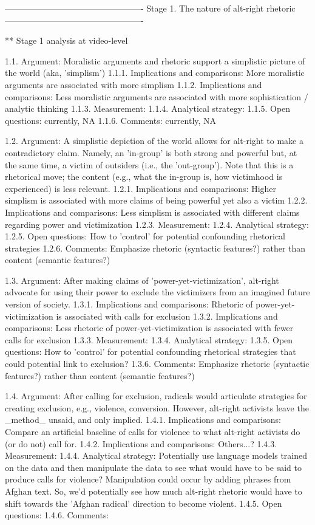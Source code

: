 
-------------------------------------------------
Stage 1. The nature of alt-right rhetoric
-------------------------------------------------

** Stage 1 analysis at video-level

1.1. Argument: Moralistic arguments and rhetoric support a simplistic picture of the world (aka, 'simplism')
1.1.1. Implications and comparisons: More moralistic arguments are associated with more simplism
1.1.2. Implications and comparisons: Less moralistic arguments are associated with more sophistication / analytic thinking
1.1.3. Measurement:
1.1.4. Analytical strategy:
1.1.5. Open questions: currently, NA
1.1.6. Comments: currently, NA

1.2. Argument: A simplistic depiction of the world allows for alt-right to make a contradictory claim. Namely, an 'in-group' is both strong and powerful but, at the same time, a victim of outsiders (i.e., the 'out-group'). Note that this is a rhetorical move; the content (e.g., what the in-group is, how victimhood is experienced) is less relevant.
1.2.1. Implications and comparisons: Higher simplism is associated with more claims of being powerful yet also a victim
1.2.2. Implications and comparisons: Less simplism is associated with different claims regarding power and victimization
1.2.3. Measurement:
1.2.4. Analytical strategy:
1.2.5. Open questions: How to 'control' for potential confounding rhetorical strategies
1.2.6. Comments: Emphasize rhetoric (syntactic features?) rather than content (semantic features?)

1.3. Argument: After making claims of 'power-yet-victimization', alt-right advocate for using their power to exclude the victimizers from an imagined future version of society.
1.3.1. Implications and comparisons: Rhetoric of power-yet-victimization is associated with calls for exclusion
1.3.2. Implications and comparisons: Less rhetoric of power-yet-victimization is associated with fewer calls for exclusion
1.3.3. Measurement:
1.3.4. Analytical strategy:
1.3.5. Open questions: How to 'control' for potential confounding rhetorical strategies that could potential link to exclusion?
1.3.6. Comments: Emphasize rhetoric (syntactic features?) rather than content (semantic features?) 

1.4. Argument: After calling for exclusion, radicals would articulate strategies for creating exclusion, e.g., violence, conversion. However, alt-right activists leave the _method_ unsaid, and only implied.
1.4.1. Implications and comparisons: Compare an artificial baseline of calls for violence to what alt-right activists do (or do not) call for.
1.4.2. Implications and comparisons: Others...?
1.4.3. Measurement: 
1.4.4. Analytical strategy: Potentially use language models trained on the data and then manipulate the data to see what would have to be said to produce calls for violence? Manipulation could occur by adding phrases from Afghan text. So, we'd potentially see how much alt-right rhetoric would have to shift towards the 'Afghan radical' direction to become violent.
1.4.5. Open questions: 
1.4.6. Comments: 

